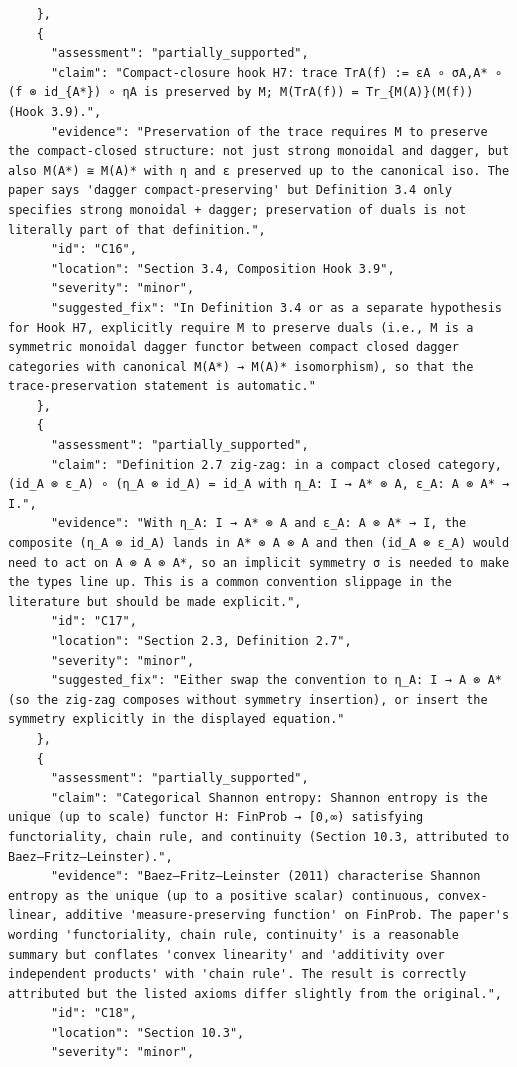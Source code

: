 \documentclass[11pt]{article}
\begin{document}
\begin{verbatim}
    },
    {
      "assessment": "partially_supported",
      "claim": "Compact-closure hook H7: trace TrA(f) := εA ∘ σA,A* ∘ (f ⊗ id_{A*}) ∘ ηA is preserved by M; M(TrA(f)) = Tr_{M(A)}(M(f)) (Hook 3.9).",
      "evidence": "Preservation of the trace requires M to preserve the compact-closed structure: not just strong monoidal and dagger, but also M(A*) ≅ M(A)* with η and ε preserved up to the canonical iso. The paper says 'dagger compact-preserving' but Definition 3.4 only specifies strong monoidal + dagger; preservation of duals is not literally part of that definition.",
      "id": "C16",
      "location": "Section 3.4, Composition Hook 3.9",
      "severity": "minor",
      "suggested_fix": "In Definition 3.4 or as a separate hypothesis for Hook H7, explicitly require M to preserve duals (i.e., M is a symmetric monoidal dagger functor between compact closed dagger categories with canonical M(A*) → M(A)* isomorphism), so that the trace-preservation statement is automatic."
    },
    {
      "assessment": "partially_supported",
      "claim": "Definition 2.7 zig-zag: in a compact closed category, (id_A ⊗ ε_A) ∘ (η_A ⊗ id_A) = id_A with η_A: I → A* ⊗ A, ε_A: A ⊗ A* → I.",
      "evidence": "With η_A: I → A* ⊗ A and ε_A: A ⊗ A* → I, the composite (η_A ⊗ id_A) lands in A* ⊗ A ⊗ A and then (id_A ⊗ ε_A) would need to act on A ⊗ A ⊗ A*, so an implicit symmetry σ is needed to make the types line up. This is a common convention slippage in the literature but should be made explicit.",
      "id": "C17",
      "location": "Section 2.3, Definition 2.7",
      "severity": "minor",
      "suggested_fix": "Either swap the convention to η_A: I → A ⊗ A* (so the zig-zag composes without symmetry insertion), or insert the symmetry explicitly in the displayed equation."
    },
    {
      "assessment": "partially_supported",
      "claim": "Categorical Shannon entropy: Shannon entropy is the unique (up to scale) functor H: FinProb → [0,∞) satisfying functoriality, chain rule, and continuity (Section 10.3, attributed to Baez–Fritz–Leinster).",
      "evidence": "Baez–Fritz–Leinster (2011) characterise Shannon entropy as the unique (up to a positive scalar) continuous, convex-linear, additive 'measure-preserving function' on FinProb. The paper's wording 'functoriality, chain rule, continuity' is a reasonable summary but conflates 'convex linearity' and 'additivity over independent products' with 'chain rule'. The result is correctly attributed but the listed axioms differ slightly from the original.",
      "id": "C18",
      "location": "Section 10.3",
      "severity": "minor",

\end{verbatim}
\end{document}
